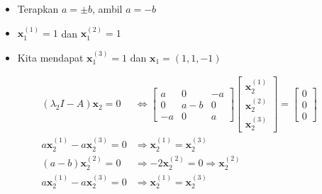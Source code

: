 \documentclass[12pt, a4paper]{scrartcl}
\begin{document}
\begin{enumerate}
            \begin{itemize}
                \item[] Terapkan $a = \pm b$, ambil $a=-b$
                \item[] $\textbf{x}_1^{(1)}=1$ dan $\textbf{x}_1^{(2)}=1$
                \item[] Kita mendapat $\textbf{x}_1^{(3)}=1$ dan $\textbf{x}_1=(1,1,-1)$
            \end{itemize}
            \begin{align*}
                (\lambda_2I-A)\textbf{x}_2=0 &\Leftrightarrow \begin{bmatrix}
                    a&0&-a\\0&a-b&0\\-a&0&a
                \end{bmatrix}\begin{bmatrix}
                    \textbf{x}_2^{(1)} \\ \textbf{x}_2^{(2)} \\ \textbf{x}_2^{(3)}
                \end{bmatrix} = \begin{bmatrix}
                    0\\0\\0
                \end{bmatrix}
                \\ a\textbf{x}_2^{(1)} - a\textbf{x}_2^{(3)} = 0 &\Rightarrow \textbf{x}_2^{(1)} = \textbf{x}_2^{(3)}
                \\ (a-b)\textbf{x}_2^{(2)}= 0 &\Rightarrow -2\textbf{x}_2^{(2)} = 0 \Rightarrow \textbf{x}_2^{(2)}
                \\ a\textbf{x}_2^{(1)} - a\textbf{x}_2^{(3)} = 0 &\Rightarrow \textbf{x}_2^{(1)} = \textbf{x}_2^{(3)} 
            \end{align*}


\end{enumerate}
\end{document}
